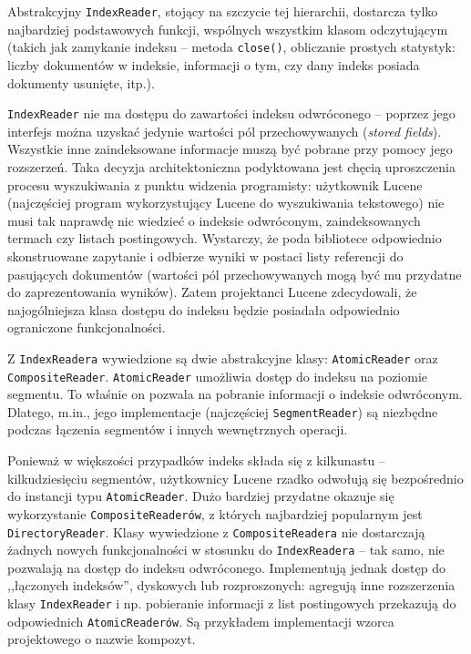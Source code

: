 Abstrakcyjny \texttt{IndexReader}, stojący na szczycie tej hierarchii, dostarcza tylko najbardziej podstawowych funkcji, wspólnych wszystkim klasom odczytującym (takich jak zamykanie indeksu -- metoda \texttt{close()}, obliczanie prostych statystyk: liczby dokumentów w indeksie, informacji o tym, czy dany indeks posiada dokumenty usunięte, itp.). 

\texttt{IndexReader} nie ma dostępu do zawartości indeksu odwróconego -- poprzez jego interfejs można uzyskać jedynie wartości pól przechowywanych (\emph{stored fields}). Wszystkie inne zaindeksowane informacje muszą być pobrane przy pomocy jego rozszerzeń. Taka decyzja architektoniczna podyktowana jest chęcią uproszczenia procesu wyszukiwania z punktu widzenia programisty: użytkownik Lucene (najczęściej program wykorzystujący Lucene do wyszukiwania tekstowego) nie musi tak naprawdę nic wiedzieć o indeksie odwróconym, zaindeksowanych termach czy listach postingowych. Wystarczy, że poda bibliotece odpowiednio skonstruowane zapytanie i odbierze wyniki w postaci listy referencji do pasujących dokumentów (wartości pól przechowywanych mogą być mu przydatne do zaprezentowania wyników). Zatem projektanci Lucene zdecydowali, że najogólniejsza klasa dostępu do indeksu będzie posiadała odpowiednio ograniczone funkcjonalności.

Z \texttt{IndexReadera} wywiedzione są dwie abstrakcyjne klasy: \texttt{AtomicReader} oraz \texttt{CompositeReader}. \texttt{AtomicReader} umożliwia dostęp do indeksu na poziomie segmentu. To właśnie on pozwala na pobranie informacji o indeksie odwróconym. Dlatego, m.in., jego implementacje (najczęściej \texttt{SegmentReader}) są niezbędne podczas łączenia segmentów i innych wewnętrznych operacji.

Ponieważ w większości przypadków indeks składa się z kilkunastu -- kilkudziesięciu segmentów, użytkownicy Lucene rzadko odwołują się bezpośrednio do instancji typu \texttt{AtomicReader}. Dużo bardziej przydatne okazuje się wykorzystanie \texttt{CompositeReaderów}, z których najbardziej popularnym jest \texttt{DirectoryReader}. Klasy wywiedzione z \texttt{CompositeReadera} nie dostarczają żadnych nowych funkcjonalności w stosunku do \texttt{IndexReadera} -- tak samo, nie pozwalają na dostęp do indeksu odwróconego. Implementują jednak dostęp do ,,łączonych indeksów'', dyskowych lub rozproszonych: agregują inne rozszerzenia klasy \texttt{IndexReader} i np. pobieranie informacji z list postingowych przekazują do odpowiednich \texttt{AtomicReaderów}. Są przykładem implementacji wzorca projektowego o nazwie kompozyt.


